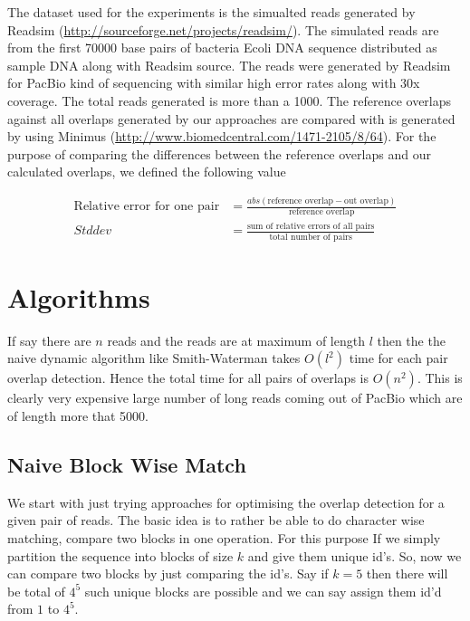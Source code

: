 \documentclass{article}
\begin{document}
        The dataset used for the experiments is the simualted reads generated by Readsim (\url{http://sourceforge.net/projects/readsim/}). The simulated reads are from the first 70000 base pairs of bacteria Ecoli DNA sequence distributed as sample DNA along with Readsim source. The reads were generated by Readsim for PacBio kind of sequencing with similar high error rates along with 30x coverage. The total reads generated is more than a 1000. The reference overlaps against all overlaps generated by our approaches are compared with is generated by using Minimus (\url{http://www.biomedcentral.com/1471-2105/8/64}). For the purpose of comparing the differences between the reference overlaps and our calculated overlaps, we defined the following value
        
        \begin{align*}
            \text{Relative error for one pair} &= \frac{abs(\text{reference overlap} - \text{out overlap})} {\text{reference overlap}} \\
            Stddev &= \frac{\text{sum of relative errors of all pairs}}{\text{total number of pairs}}
        \end{align*}
        
    \section{Algorithms}
    
        If say there are $n$ reads and the reads are at maximum of length $l$ then the the naive dynamic algorithm like Smith-Waterman takes $O(l^2)$ time for each pair overlap detection. Hence the total time for all pairs of overlaps is $O(n^2)$. This is clearly very expensive large number of long reads coming out of PacBio which are of length more that 5000.
        
        \subsection{Naive Block Wise Match}
        
            We start with just trying approaches for optimising the overlap detection for a given pair of reads. The basic idea is to rather be able to do character wise matching, compare two blocks in one operation. For this purpose If we simply partition the sequence into blocks of size $k$ and give them unique id's. So, now we can compare two blocks by just comparing the id's. Say if $k = 5$ then there will be total of $4^5$ such unique blocks are possible and we can say assign them id'd from $1$ to $4^5$.
            
\end{document}
